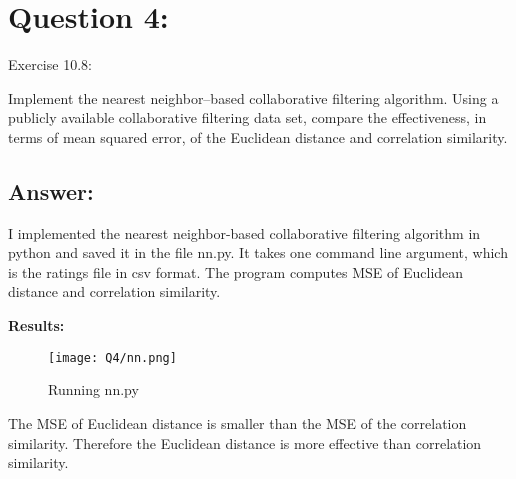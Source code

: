 \section*{Question 4:}
Exercise 10.8:

Implement the nearest neighbor–based collaborative filtering algorithm. Using a publicly available collaborative filtering data set, compare the effectiveness, in terms of mean squared error, of the Euclidean distance and correlation similarity.

\subsection*{Answer:}
I implemented the nearest neighbor-based collaborative filtering algorithm in python and saved it in the file nn.py. It takes one command line argument, which is the ratings file in csv format. The program computes MSE of Euclidean distance and correlation similarity.




\textbf{Results:}

\begin{figure}[h]
\caption{Running nn.py}
\centering
\texttt{[image: Q4/nn.png]}
\end{figure}

The MSE of Euclidean distance is smaller than the MSE of the correlation similarity. Therefore the Euclidean distance is more effective than correlation similarity.

